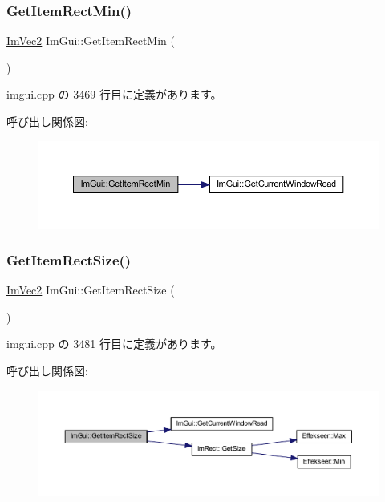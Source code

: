 \subsubsection{\texorpdfstring{Get\+Item\+Rect\+Min()}{GetItemRectMin()}}
{\footnotesize\ttfamily \mbox{\hyperlink{struct_im_vec2}{Im\+Vec2}} Im\+Gui\+::\+Get\+Item\+Rect\+Min (\begin{DoxyParamCaption}{ }\end{DoxyParamCaption})}



 imgui.\+cpp の 3469 行目に定義があります。

呼び出し関係図\+:\nopagebreak
\begin{figure}[H]
\begin{center}
\leavevmode
\includegraphics[width=350pt]{namespace_im_gui_a65b24b72ec0e8444c705cebf3e91f570_cgraph}
\end{center}
\end{figure}
\mbox{\label{namespace_im_gui_a3303d1c37041307e11fd46fc43b2274d}} 
\subsubsection{\texorpdfstring{Get\+Item\+Rect\+Size()}{GetItemRectSize()}}
{\footnotesize\ttfamily \mbox{\hyperlink{struct_im_vec2}{Im\+Vec2}} Im\+Gui\+::\+Get\+Item\+Rect\+Size (\begin{DoxyParamCaption}{ }\end{DoxyParamCaption})}



 imgui.\+cpp の 3481 行目に定義があります。

呼び出し関係図\+:\nopagebreak
\begin{figure}[H]
\begin{center}
\leavevmode
\includegraphics[width=350pt]{namespace_im_gui_a3303d1c37041307e11fd46fc43b2274d_cgraph}
\end{center}
\end{figure}
\mbox{\label{namespace_im_gui_a85a5202a65c0663858dba55a206761c5}} 
